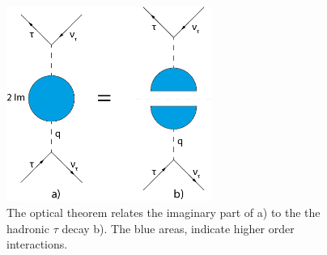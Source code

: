 \begin{figure}[t]
	\label{fig:tauOpticalTheorem}
	\centering
	\includegraphics[width=0.6\textwidth]{img/appendix/tauOpticalTheorem.png}
	\caption{The optical theorem relates the imaginary part of a) to the the hadronic $\tau$ decay b). The blue areas, indicate higher order interactions.}
\end{figure}

